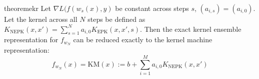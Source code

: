 
\begin{restatable}{theorem}{ekr}
\label{thm:ekr}
Let $\nabla L(f(w_{s}(x), y)$ be constant  across steps $s$, $(a_{i,s}) = (a_{i,0})$. Let the kernel across all $N$ steps be defined as $K_{\text{NEPK}}(x,x') = \sum_{s = 1}^N a_{i,0} K_{\text{EPK}}(x, x', s).$ Then the exact kernel ensemble representation for $f_{w_N}$ can be reduced exactly to the kernel machine representation:
\begin{equation}
f_{w_N}(x) = \text{KM}(x) := b + \sum_{i = 1}^{M} a_{i,0} K_{\text{NEPK}}(x,x')
\label{exact}
\end{equation}
\end{restatable}

